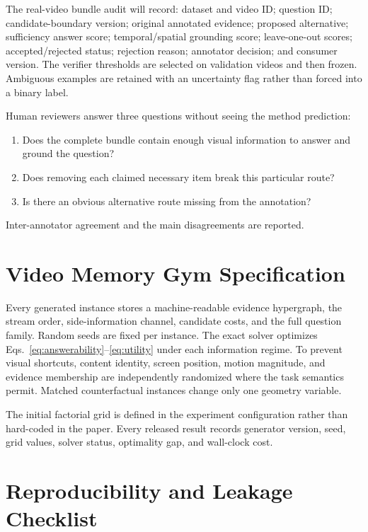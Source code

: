 \documentclass[10pt,twocolumn,letterpaper]{article}
\begin{document}
The real-video bundle audit will record: dataset and video ID; question ID; candidate-boundary version; original annotated evidence; proposed alternative; sufficiency answer score; temporal/spatial grounding score; leave-one-out scores; accepted/rejected status; rejection reason; annotator decision; and consumer version.
The verifier thresholds are selected on validation videos and then frozen.
Ambiguous examples are retained with an uncertainty flag rather than forced into a binary label.

Human reviewers answer three questions without seeing the method prediction:
\begin{enumerate}[leftmargin=*,itemsep=1pt]
    \item Does the complete bundle contain enough visual information to answer and ground the question?
    \item Does removing each claimed necessary item break this particular route?
    \item Is there an obvious alternative route missing from the annotation?
\end{enumerate}
Inter-annotator agreement and the main disagreements are reported.

\section{Video Memory Gym Specification}
\label{app:gym}

Every generated instance stores a machine-readable evidence hypergraph, the stream order, side-information channel, candidate costs, and the full question family.
Random seeds are fixed per instance.
The exact solver optimizes Eqs.~\eqref{eq:answerability}--\eqref{eq:utility} under each information regime.
To prevent visual shortcuts, content identity, screen position, motion magnitude, and evidence membership are independently randomized where the task semantics permit.
Matched counterfactual instances change only one geometry variable.

The initial factorial grid is defined in the experiment configuration rather than hard-coded in the paper.
Every released result records generator version, seed, grid values, solver status, optimality gap, and wall-clock cost.

\section{Reproducibility and Leakage Checklist}
\label{app:checklist}
\end{document}

